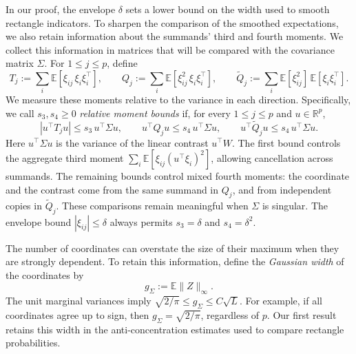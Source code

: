 \documentclass[11pt,letterpaper,twoside,leqno]{article}
\theoremstyle{bookplain}
\theoremstyle{bookremark}
\newcommand{\E}{\mathbb E}
\newcommand{\R}{\mathbb R}
\begin{document}
{
In our proof, the envelope \(\delta\) sets a lower bound on the width
used to smooth rectangle indicators. To sharpen the comparison of the
smoothed expectations, we also retain information about the summands'
third and fourth moments. We collect this information in matrices that
will be compared with the covariance matrix \(\Sigma\). For
\(1\le j\le p\), define
\[
 T_j:=\sum_i\E[\xi_{ij}\,\xi_i\xi_i^\top],\qquad
 Q_j:=\sum_i\E[\xi_{ij}^2\,\xi_i\xi_i^\top],\qquad
 \widetilde Q_j:=\sum_i\E[\xi_{ij}^2]\,\E[\xi_i\xi_i^\top].
\]
We measure these moments relative to the variance in each direction.
Specifically, we call \(s_3,s_4\ge0\) \emph{relative moment bounds} if,
for every \(1\le j\le p\) and \(u\in\R^p\),
\begin{equation}\label{eq:relative-moments}
 |u^\top T_j u|\le s_3\,u^\top\Sigma u,\qquad
 u^\top Q_j u\le s_4\,u^\top\Sigma u,\qquad
 u^\top\widetilde Q_j u\le s_4\,u^\top\Sigma u.
\end{equation}
Here \(u^\top\Sigma u\) is the variance of the linear contrast
\(u^\top W\). The first bound controls the aggregate third moment
\(\sum_i\E[\xi_{ij}(u^\top\xi_i)^2]\), allowing cancellation across
summands. The remaining bounds control mixed fourth moments: the
coordinate and the contrast come from the same summand in \(Q_j\),
and from independent copies in \(\widetilde Q_j\). These comparisons
remain meaningful when \(\Sigma\) is singular. The envelope bound
\(|\xi_{ij}|\le\delta\) always permits \(s_3=\delta\) and
\(s_4=\delta^2\).
}

The number of coordinates can overstate the size of their maximum
when they are strongly dependent. To retain this information, define
the \emph{Gaussian width} of the coordinates by
\[
 g_\Sigma:=\E\|Z\|_\infty.
\]
The unit marginal variances imply
\(\sqrt{2/\pi}\le g_\Sigma\le C\sqrt L\). For example, if all
coordinates agree up to sign, then \(g_\Sigma=\sqrt{2/\pi}\),
regardless of \(p\). Our first result retains this width in the
anti-concentration estimates used to compare rectangle probabilities.
\end{document}
